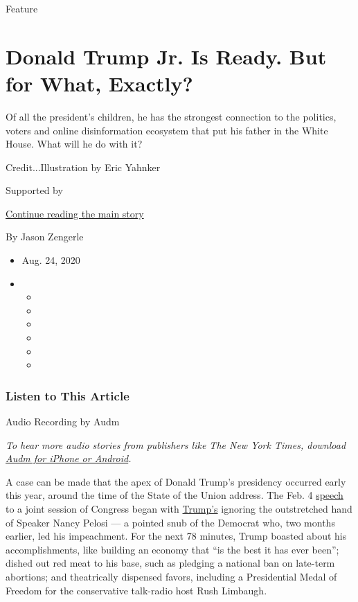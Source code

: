 Feature

\hypertarget{donald-trump-jr-is-ready-but-for-what-exactly}{%
\section{Donald Trump Jr. Is Ready. But for What,
Exactly?}\label{donald-trump-jr-is-ready-but-for-what-exactly}}

Of all the president's children, he has the strongest connection to the
politics, voters and online disinformation ecosystem that put his father
in the White House. What will he do with it?

Credit...Illustration by Eric Yahnker

Supported by

\protect\hyperlink{after-sponsor}{Continue reading the main story}

By Jason Zengerle

\begin{itemize}
\item
  Aug. 24, 2020
\item
  \begin{itemize}
  \item
  \item
  \item
  \item
  \item
  \item
  \end{itemize}
\end{itemize}

\hypertarget{listen-to-this-article}{%
\subsubsection{Listen to This Article}\label{listen-to-this-article}}

Audio Recording by Audm

\emph{To hear more audio stories from publishers like The New York
Times, download}
\emph{\href{https://www.audm.com/?utm_source=nytmag\&utm_medium=embed\&utm_campaign=the_next_trump}{Audm
for iPhone or Android}.}

A case can be made that the apex of Donald Trump's presidency occurred
early this year, around the time of the State of the Union address. The
Feb. 4
\href{https://www.nytimes3xbfgragh.onion/2020/02/05/us/politics/state-of-union-speech-address.html}{speech}
to a joint session of Congress began with
\href{https://www.nytimes3xbfgragh.onion/2020/08/24/nyregion/letitia-james-trump-projects-investigation.html}{Trump's}
ignoring the outstretched hand of Speaker Nancy Pelosi --- a pointed
snub of the Democrat who, two months earlier, led his impeachment. For
the next 78 minutes, Trump boasted about his accomplishments, like
building an economy that ``is the best it has ever been''; dished out
red meat to his base, such as pledging a national ban on late-term
abortions; and theatrically dispensed favors, including a Presidential
Medal of Freedom for the conservative talk-radio host Rush Limbaugh.

